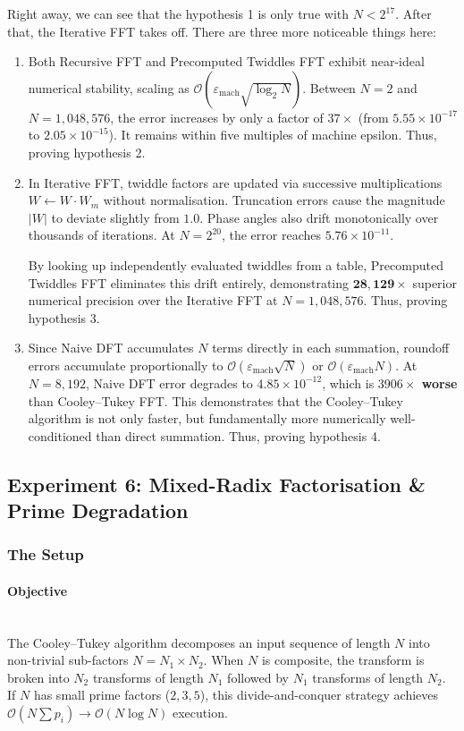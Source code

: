 \documentclass{article}
\begin{document}
Right away, we can see that the hypothesis 1 is only true with $N<2^{17}$. After that, the Iterative FFT takes off. There are three more noticeable things here:
\begin{enumerate}
    \item Both Recursive FFT and Precomputed Twiddles FFT exhibit near-ideal numerical stability, scaling as $\mathcal{O}(\varepsilon_{\text{mach}} \sqrt{\log_2 N})$. Between $N = 2$ and $N = 1,048,576$, the error increases by only a factor of $37\times$ (from $5.55 \times 10^{-17}$ to $2.05 \times 10^{-15}$). It remains within five multiples of machine epsilon. Thus, proving hypothesis 2.
    \item In Iterative FFT, twiddle factors are updated via successive multiplications $W \gets W \cdot W_m$ without normalisation. Truncation errors cause the magnitude $|W|$ to deviate slightly from $1.0$. Phase angles also drift monotonically over thousands of iterations. At $N = 2^{20}$, the error reaches $5.76 \times 10^{-11}$. 
    
    By looking up independently evaluated twiddles from a table, Precomputed Twiddles FFT eliminates this drift entirely, demonstrating $\mathbf{28,129\times}$ superior numerical precision over the Iterative FFT at $N = 1,048,576$. Thus, proving hypothesis 3.
    \item Since Naive DFT accumulates $N$ terms directly in each summation, roundoff errors accumulate proportionally to $\mathcal{O}(\varepsilon_{\text{mach}} \sqrt{N})$ or $\mathcal{O}(\varepsilon_{\text{mach}} N)$. At $N = 8,192$, Naive DFT error degrades to $4.85 \times 10^{-12}$, which is \textbf{$3906\times$ worse} than Cooley--Tukey FFT. This demonstrates that the Cooley--Tukey algorithm is not only faster, but fundamentally more numerically well-conditioned than direct summation. Thus, proving hypothesis 4.
\end{enumerate}

\subsection{Experiment 6: Mixed-Radix Factorisation \& Prime Degradation} \label{sec:exp6_design}
\subsubsection*{The Setup}
\paragraph{Objective}~{}\\
The Cooley--Tukey algorithm decomposes an input sequence of length $N$ into non-trivial sub-factors $N = N_1 \times N_2$. When $N$ is composite, the transform is broken into $N_2$ transforms of length $N_1$ followed by $N_1$ transforms of length $N_2$. If $N$ has small prime factors ($2, 3, 5$), this divide-and-conquer strategy achieves $\mathcal{O}(N \sum p_i) \to \mathcal{O}(N \log N)$ execution.
\end{document}

